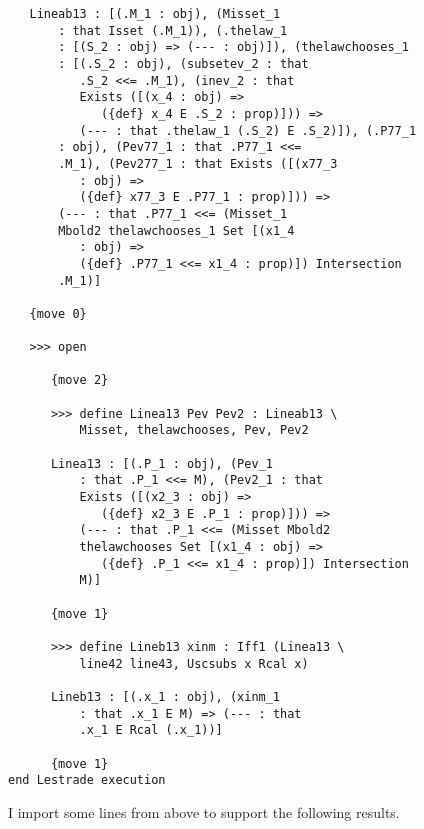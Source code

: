 \documentclass[12pt]{article}
\begin{document}
\begin{verbatim}
   Lineab13 : [(.M_1 : obj), (Misset_1 
       : that Isset (.M_1)), (.thelaw_1 
       : [(S_2 : obj) => (--- : obj)]), (thelawchooses_1 
       : [(.S_2 : obj), (subsetev_2 : that 
          .S_2 <<= .M_1), (inev_2 : that 
          Exists ([(x_4 : obj) => 
             ({def} x_4 E .S_2 : prop)])) => 
          (--- : that .thelaw_1 (.S_2) E .S_2)]), (.P77_1 
       : obj), (Pev77_1 : that .P77_1 <<= 
       .M_1), (Pev277_1 : that Exists ([(x77_3 
          : obj) => 
          ({def} x77_3 E .P77_1 : prop)])) => 
       (--- : that .P77_1 <<= (Misset_1 
       Mbold2 thelawchooses_1 Set [(x1_4 
          : obj) => 
          ({def} .P77_1 <<= x1_4 : prop)]) Intersection 
       .M_1)]

   {move 0}

   >>> open

      {move 2}

      >>> define Linea13 Pev Pev2 : Lineab13 \
          Misset, thelawchooses, Pev, Pev2

      Linea13 : [(.P_1 : obj), (Pev_1 
          : that .P_1 <<= M), (Pev2_1 : that 
          Exists ([(x2_3 : obj) => 
             ({def} x2_3 E .P_1 : prop)])) => 
          (--- : that .P_1 <<= (Misset Mbold2 
          thelawchooses Set [(x1_4 : obj) => 
             ({def} .P_1 <<= x1_4 : prop)]) Intersection 
          M)]

      {move 1}

      >>> define Lineb13 xinm : Iff1 (Linea13 \
          line42 line43, Uscsubs x Rcal x)

      Lineb13 : [(.x_1 : obj), (xinm_1 
          : that .x_1 E M) => (--- : that 
          .x_1 E Rcal (.x_1))]

      {move 1}
end Lestrade execution
\end{verbatim}

I import some lines from above to support the following results.
\end{document}
